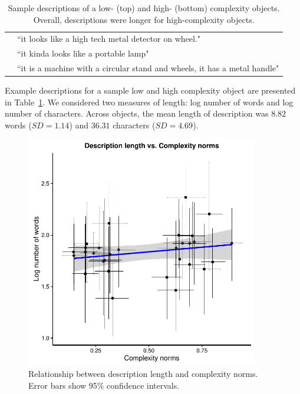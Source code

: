 \begin{table}[t!]
\begin{tabular}{ll}
                   & ``it looks like a high tech metal detector on wheel."                                   \\
                   & ``it kinda looks like a portable lamp"                                \\  
                   & ``it is a machine with a circular stand and wheels, it has a metal handle"\\
   \bottomrule
\end{tabular}
\caption{Sample descriptions of a low- (top) and high- (bottom)  complexity objects.  Overall, descriptions were longer for high-complexity objects.}
\label{tab:sample_obj_descriptions}
\end{table}


Example descriptions for a sample low and high complexity object are presented in Table~\ref{tab:sample_obj_descriptions}. We considered two measures of length:  log number of words and log number of characters. Across objects, the mean length of description was  $8.82$ words ($SD = 1.14$) and $36.31$ characters ($SD = 4.69$).

 \begin{figure}
 \begin{center}
  \includegraphics[width=4in]{figs/desc_length_word.pdf}
  \caption{\label{fig:desc_length} Relationship between description length and complexity norms. Error bars show  95\% confidence intervals.}
 \end{center}
\end{figure}


